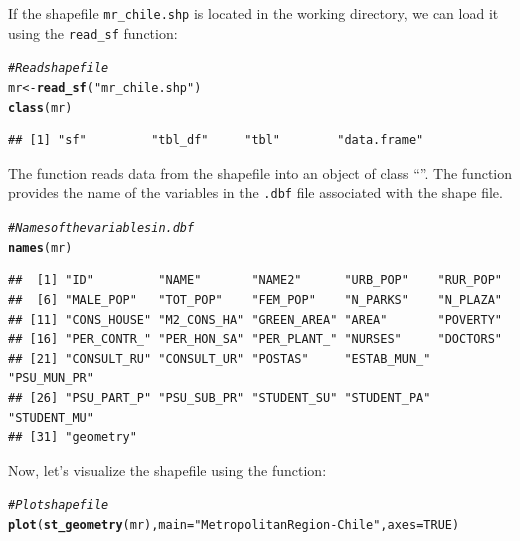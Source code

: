 \documentclass[english,12pt]{book}\usepackage[]{graphicx}\usepackage[]{xcolor}
\makeatletter
\newcommand{\hlnum}[1]{\textcolor[rgb]{0.686,0.059,0.569}{#1}}%
\newcommand{\hlstr}[1]{\textcolor[rgb]{0.192,0.494,0.8}{#1}}%
\newcommand{\hlcom}[1]{\textcolor[rgb]{0.678,0.584,0.686}{\textit{#1}}}%
\newcommand{\hlstd}[1]{\textcolor[rgb]{0.345,0.345,0.345}{#1}}%
\newcommand{\hlkwb}[1]{\textcolor[rgb]{0.69,0.353,0.396}{#1}}%
\newcommand{\hlkwc}[1]{\textcolor[rgb]{0.333,0.667,0.333}{#1}}%
\newcommand{\hlkwd}[1]{\textcolor[rgb]{0.737,0.353,0.396}{\textbf{#1}}}%
\newenvironment{kframe}{%
 \def\at@end@of@kframe{}%
 \ifinner\ifhmode%
  \def\at@end@of@kframe{\end{minipage}}%
  \begin{minipage}{\columnwidth}%
 \fi\fi%
 \def\FrameCommand##1{\hskip\@totalleftmargin \hskip-\fboxsep
 \colorbox{shadecolor}{##1}\hskip-\fboxsep
     \hskip-\linewidth \hskip-\@totalleftmargin \hskip\columnwidth}%
 \MakeFramed {\advance\hsize-\width
   \@totalleftmargin\z@ \linewidth\hsize
   \@setminipage}}%
 {\par\unskip\endMakeFramed%
 \at@end@of@kframe}
\newenvironment{knitrout}{}{} %
\makeatother
\begin{document}
If the shapefile \texttt{mr\_chile.shp} is located in the working directory, we can load it using the \texttt{read\_sf} function:
\begin{knitrout}
\color{fgcolor}\begin{kframe}
\begin{alltt}
\hlcom{# Read shape file}
\hlstd{mr} \hlkwb{<-} \hlkwd{read_sf}\hlstd{(}\hlstr{"mr_chile.shp"}\hlstd{)}
\hlkwd{class}\hlstd{(mr)}
\end{alltt}
\begin{verbatim}
## [1] "sf"         "tbl_df"     "tbl"        "data.frame"
\end{verbatim}
\end{kframe}
\end{knitrout}

The  function reads data from the shapefile into an object of class ``''. The  function provides the name of the variables in the \texttt{.dbf} file associated with the shape file. 

\begin{knitrout}
\color{fgcolor}\begin{kframe}
\begin{alltt}
\hlcom{# Names of the variables in .dbf}
\hlkwd{names}\hlstd{(mr)}
\end{alltt}
\begin{verbatim}
##  [1] "ID"         "NAME"       "NAME2"      "URB_POP"    "RUR_POP"   
##  [6] "MALE_POP"   "TOT_POP"    "FEM_POP"    "N_PARKS"    "N_PLAZA"   
## [11] "CONS_HOUSE" "M2_CONS_HA" "GREEN_AREA" "AREA"       "POVERTY"   
## [16] "PER_CONTR_" "PER_HON_SA" "PER_PLANT_" "NURSES"     "DOCTORS"   
## [21] "CONSULT_RU" "CONSULT_UR" "POSTAS"     "ESTAB_MUN_" "PSU_MUN_PR"
## [26] "PSU_PART_P" "PSU_SUB_PR" "STUDENT_SU" "STUDENT_PA" "STUDENT_MU"
## [31] "geometry"
\end{verbatim}
\end{kframe}
\end{knitrout}

Now, let's visualize the shapefile using the  function:

\begin{knitrout}
\color{fgcolor}\begin{kframe}
\begin{alltt}
\hlcom{# Plot shapefile}
\hlkwd{plot}\hlstd{(}\hlkwd{st_geometry}\hlstd{(mr),} \hlkwc{main} \hlstd{=} \hlstr{"Metropolitan Region-Chile"}\hlstd{,} \hlkwc{axes} \hlstd{=} \hlnum{TRUE}\hlstd{)}
\end{alltt}
\end{kframe}
\end{knitrout}
\end{document}
